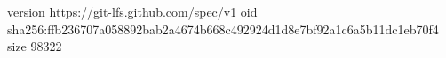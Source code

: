 version https://git-lfs.github.com/spec/v1
oid sha256:ffb236707a058892bab2a4674b668c492924d1d8e7bf92a1c6a5b11dc1eb70f4
size 98322
